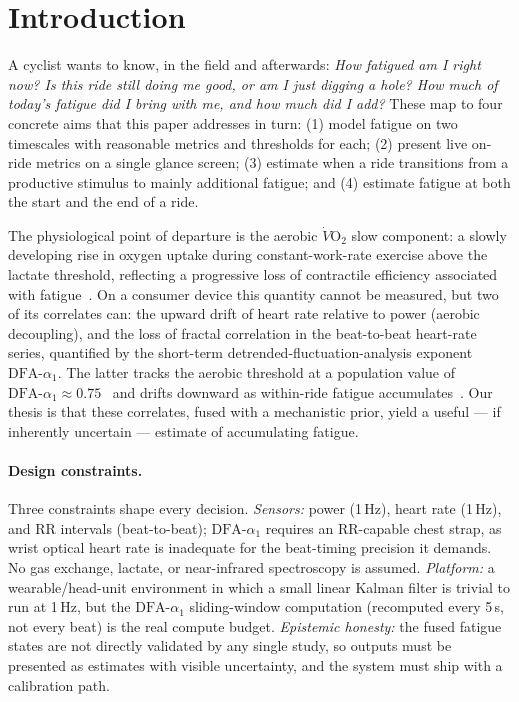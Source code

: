 \documentclass[11pt]{article}
\newcommand{\aone}{\ensuremath{\text{DFA-}\alpha_1}}
\begin{document}
\section{Introduction}\label{sec:intro}

A cyclist wants to know, in the field and afterwards: \emph{How fatigued am I right now? Is this ride still doing me good, or am I just digging a hole? How much of today's fatigue did I bring with me, and how much did I add?} These map to four concrete aims that this paper addresses in turn: (1) model fatigue on two timescales with reasonable metrics and thresholds for each; (2) present live on-ride metrics on a single glance screen; (3) estimate when a ride transitions from a productive stimulus to mainly additional fatigue; and (4) estimate fatigue at both the start and the end of a ride.

The physiological point of departure is the aerobic $\dot{V}\mathrm{O_2}$ slow component: a slowly developing rise in oxygen uptake during constant-work-rate exercise above the lactate threshold, reflecting a progressive loss of contractile efficiency associated with fatigue~\cite{jones}. On a consumer device this quantity cannot be measured, but two of its correlates can: the upward drift of heart rate relative to power (aerobic decoupling), and the loss of fractal correlation in the beat-to-beat heart-rate series, quantified by the short-term detrended-fluctuation-analysis exponent $\aone$. The latter tracks the aerobic threshold at a population value of $\aone \approx 0.75$~\cite{rogers2020} and drifts downward as within-ride fatigue accumulates~\cite{rogers2022}. Our thesis is that these correlates, fused with a mechanistic prior, yield a useful --- if inherently uncertain --- estimate of accumulating fatigue.

\paragraph{Design constraints.} Three constraints shape every decision. \emph{Sensors:} power (1\,Hz), heart rate (1\,Hz), and RR intervals (beat-to-beat); $\aone$ requires an RR-capable chest strap, as wrist optical heart rate is inadequate for the beat-timing precision it demands. No gas exchange, lactate, or near-infrared spectroscopy is assumed. \emph{Platform:} a wearable/head-unit environment in which a small linear Kalman filter is trivial to run at 1\,Hz, but the $\aone$ sliding-window computation (recomputed every 5\,s, not every beat) is the real compute budget. \emph{Epistemic honesty:} the fused fatigue states are not directly validated by any single study, so outputs must be presented as estimates with visible uncertainty, and the system must ship with a calibration path.
\end{document}
